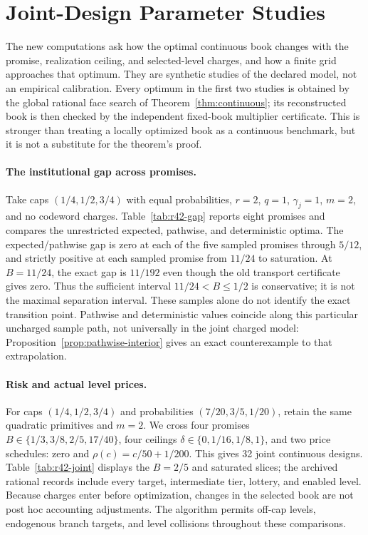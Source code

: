 \section{Joint-Design Parameter Studies}\label{sec:joint-study}
The new computations ask how the optimal continuous book changes with the promise, realization ceiling, and selected-level charges, and how a finite grid approaches that optimum. They are synthetic studies of the declared model, not an empirical calibration. Every optimum in the first two studies is obtained by the global rational face search of Theorem~\ref{thm:continuous}; its reconstructed book is then checked by the independent fixed-book multiplier certificate. This is stronger than treating a locally optimized book as a continuous benchmark, but it is not a substitute for the theorem's proof.

\paragraph{The institutional gap across promises.}
Take caps $(1/4,1/2,3/4)$ with equal probabilities, $r=2$, $q=1$, $\gamma_j=1$, $m=2$, and no codeword charges. Table~\ref{tab:r42-gap} reports eight promises and compares the unrestricted expected, pathwise, and deterministic optima. The expected/pathwise gap is zero at each of the five sampled promises through $5/12$, and strictly positive at each sampled promise from $11/24$ to saturation. At $B=11/24$, the exact gap is $11/192$ even though the old transport certificate gives zero. Thus the sufficient interval $11/24<B\leq1/2$ is conservative; it is not the maximal separation interval. These samples alone do not identify the exact transition point. Pathwise and deterministic values coincide along this particular uncharged sample path, not universally in the joint charged model: Proposition~\ref{prop:pathwise-interior} gives an exact counterexample to that extrapolation.

\paragraph{Risk and actual level prices.}
For caps $(1/4,1/2,3/4)$ and probabilities $(7/20,3/5,1/20)$, retain the same quadratic primitives and $m=2$. We cross four promises $B\in\{1/3,3/8,2/5,17/40\}$, four ceilings $\delta\in\{0,1/16,1/8,1\}$, and two price schedules: zero and $\rho(c)=c/50+1/200$. This gives 32 joint continuous designs. Table~\ref{tab:r42-joint} displays the $B=2/5$ and saturated slices; the archived rational records include every target, intermediate tier, lottery, and enabled level. Because charges enter before optimization, changes in the selected book are not post hoc accounting adjustments. The algorithm permits off-cap levels, endogenous branch targets, and level collisions throughout these comparisons.

